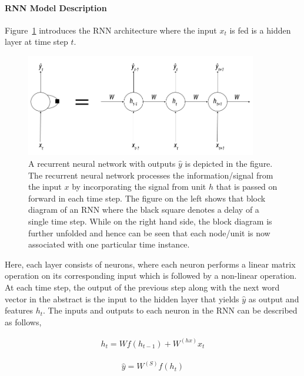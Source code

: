 \paragraph{RNN Model Description}
Figure~\ref{fig:rnnarch} introduces the RNN architecture where the input $x_t$ is fed is a hidden layer at time step $t$. 
\begin{figure}
    \includegraphics[width=0.9\textwidth, center]{Figures/rnn_figure_1.png}
    \caption{A recurrent neural network with outputs $\hat{y}$ is depicted in the figure. The recurrent neural network processes the information/signal from the input $x$ by incorporating the signal from unit $h$ that is passed on forward in each time step. The figure on the left shows that block diagram of an RNN where the black square denotes a delay of a single time step. While on the right hand side, the block diagram is further unfolded and hence can be seen that each node/unit is now associated with one particular time instance.}
    \label{fig:rnnarch}
\end{figure}
Here, each layer consists of neurons, where each neuron performs a linear matrix operation on its corresponding input which is followed by a non-linear operation. At each time step, the output of the previous step along with the next word vector in the abstract is the input to the hidden layer that yields $\hat{y}$ as output and features $h_t$. The inputs and outputs to each neuron in the RNN can be described as follows,

\begin{equation}
\begin{aligned}
    h_t = W f(h_{t-1}) + W^{(hx)}x_t
\end{aligned}
\end{equation}

\begin{equation}
\begin{aligned}
    \hat{y} = W^{(S)}f(h_{t})
\end{aligned}
\end{equation}

